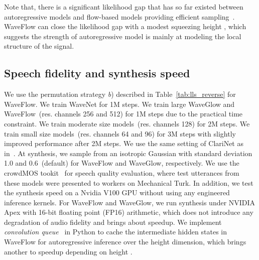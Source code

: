\documentclass{article}
\begin{document}
Note that, there is a significant likelihood gap that has so far existed between autoregressive models and flow-based models providing efficient sampling~\citep[e.g.,][]{ho2019flow++, tran2019discrete}. WaveFlow can close the likelihood gap with a modest squeezing height , which suggests the strength of autoregressive model is mainly at modeling the local structure of the signal.


\vspace{-.2em}
\subsection{Speech fidelity and synthesis speed}
\vspace{-.1em}
We use the permutation strategy \emph{b}) described in Table~\ref{tab:lls_reverse} for WaveFlow.
We train WaveNet for 1M steps.
We train large WaveGlow and WaveFlow~(res. channels 256 and 512) for 1M steps due to the practical time constraint.
We train moderate size models~(res. channels 128) for 2M steps.
We train small size models~(res. channels 64 and 96) for 3M steps with slightly improved performance after 2M steps.
We use the same setting of ClariNet as in~\citet{ping2018clarinet}.
At synthesis, we sample  from an isotropic Gaussian with standard deviation 1.0 and 0.6~(default) for WaveFlow and WaveGlow, respectively.
We use the crowdMOS tookit~\citep{ribeiro2011crowdmos} for speech quality evaluation, where test utterances from these models were presented to workers on Mechanical Turk. 
In addition, we test the synthesis speed on a Nvidia V100 GPU without using any engineered inference kernels. 
For WaveFlow and WaveGlow, we run synthesis under NVIDIA Apex with 16-bit floating point (FP16) arithmetic, which does not introduce any degradation of audio fidelity and brings about  speedup. 
We implement \emph{convolution queue}~\citep{paine2016fast} in Python to cache the intermediate hidden states in WaveFlow for autoregressive inference over the height dimension, which brings another   to  speedup depending on height . 
\end{document}
